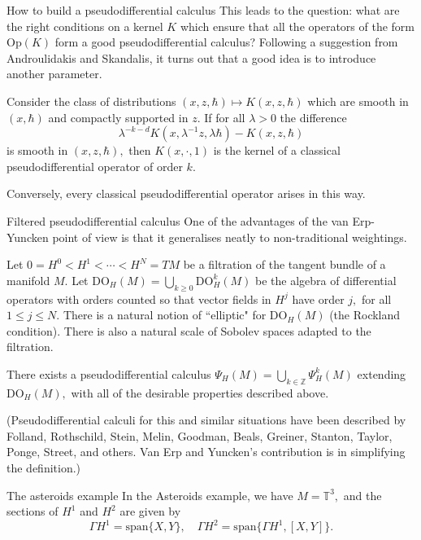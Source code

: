\documentclass{beamer}
\numberwithin{equation}{section}
\theoremstyle{plain}
\theoremstyle{plain}
\theoremstyle{definition}
\theoremstyle{plain}
\theoremstyle{plain}
\theoremstyle{definition}
\newcommand{\Itgr}{\mathbb{Z}}
\newcommand{\Circ}{\mathbb{T}}
\newcommand{\Op}{\mathrm{Op}}
\begin{document}
\begin{frame}{How to build a pseudodifferential calculus}
    This leads to the question: what are the right conditions on a kernel $K$ which ensure that all the operators of the form $\Op(K)$ form a good pseudodifferential calculus? \pause
    Following a suggestion from Androulidakis and Skandalis, it turns out that a good idea is to introduce another parameter.
    \begin{theorem}
        Consider the class of distributions $(x,z,\hbar) \mapsto K(x,z,\hbar)$ which are smooth in $(x,\hbar)$ and compactly supported in $z.$ If for all $\lambda>0$ the difference
        \[
            \lambda^{-k-d}K(x,\lambda^{-1}z,\lambda \hbar)-K(x,z,\hbar)
        \]
        is smooth in $(x,z,\hbar),$ then $K(x,\cdot,1)$ is the kernel of a classical pseudodifferential operator of order $k.$
        
        Conversely, every classical pseudodifferential operator arises in this way.
    \end{theorem}
\end{frame}

\begin{frame}{Filtered pseudodifferential calculus}
    One of the advantages of the van Erp-Yuncken point of view is that it generalises neatly to non-traditional weightings. 
    \pause
    
    Let $0=H^0<H^1 < \cdots < H^N = TM$ be a filtration of the tangent bundle of a manifold $M.$ Let $\mathrm{DO}_H(M) = \bigcup_{k\geq 0} \mathrm{DO}_H^k(M)$ be the algebra of differential operators with orders counted so that vector fields in $H^j$ have order $j,$ for all $1\leq j\leq N.$ There is a natural notion of ``elliptic" for $\mathrm{DO}_H(M)$ (the Rockland condition). There is also a natural scale of Sobolev spaces adapted to the filtration.
        \pause
    \begin{theorem}
        There exists a pseudodifferential calculus $\Psi_H(M) = \bigcup_{k\in \Itgr} \Psi^k_H(M)$ extending $\mathrm{DO}_H(M),$ 
        with all of the desirable properties described above.
    \end{theorem}
    \pause
    (Pseudodifferential calculi for this and similar situations have been described by Folland, Rothschild, Stein, Melin, Goodman, Beals, Greiner, Stanton, Taylor, Ponge, Street, and others. Van Erp and Yuncken's contribution is in simplifying the definition.)
\end{frame}

\begin{frame}{The asteroids example}
  In the Asteroids example, we have $M=\Circ^3,$ and the sections of $H^1$ and $H^2$ are given by
  \[
    \Gamma H^1 = \mathrm{span}\{X,Y\},\quad \Gamma H^2 = \mathrm{span}\{\Gamma H^1, [X,Y]\}.
  \]
\end{frame}
\end{document}
